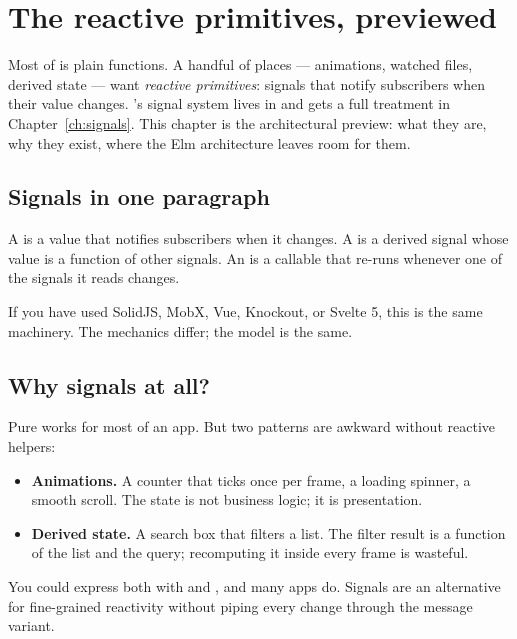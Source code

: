 \chapter{The reactive primitives, previewed}
\label{ch:reactivity-preview}

\begin{aside}
Most of \maya{} is plain functions. A handful of places ---
animations, watched files, derived state --- want \emph{reactive
primitives}: signals that notify subscribers when their value
changes. \maya{}'s signal system lives in
 and gets a full
treatment in Chapter~\ref{ch:signals}. This chapter is the
architectural preview: what they are, why they exist, where the
Elm architecture leaves room for them.
\end{aside}

\section{Signals in one paragraph}

A  is a value that notifies subscribers when it
changes. A  is a derived signal whose value is
a function of other signals. An  is a callable that
re-runs whenever one of the signals it reads changes.

If you have used SolidJS, MobX, Vue, Knockout, or Svelte 5, this
is the same machinery. The mechanics differ; the model is the
same.

\section{Why signals at all?}

Pure  works for most of an app. But two patterns
are awkward without reactive helpers:

\begin{itemize}[leftmargin=*]
  \item \textbf{Animations.} A counter that ticks once per
    frame, a loading spinner, a smooth scroll. The state is not
    business logic; it is presentation.
  \item \textbf{Derived state.} A search box that filters a
    list. The filter result is a function of the list and the
    query; recomputing it inside  every frame is
    wasteful.
\end{itemize}

You could express both with  and , and many
\maya{} apps do. Signals are an alternative for fine-grained
reactivity without piping every change through the message
variant.

